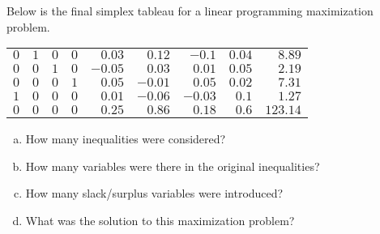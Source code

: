 \documentclass[11pt,letterpaper]{article}
\begin{document}
\newpage



 Below is the final simplex tableau for a linear programming maximization problem. \par
	\begin{table}[H]
	\centering
	\begin{tabular}{rrrrrrrrr}
	$0$ & $1$ & $0$ & $0$ & $0.03$ & $0.12$ & $-0.1$ & $0.04$ & $8.89$ \\
	$0$ & $0$ & $1$ & $0$ & $-0.05$ & $0.03$ & $0.01$ & $0.05$ & $2.19$ \\
	$0$ & $0$ & $0$ & $1$ & $0.05$ & $-0.01$ & $0.05$ & $0.02$ & $7.31$ \\
	$1$ & $0$ & $0$ & $0$ & $0.01$ & $-0.06$ & $-0.03$ & $0.1$ & $1.27$ \\
	$0$ & $0$ & $0$ & $0$ & $0.25$ & $0.86$ & $0.18$ & $0.6$ & $123.14$
	\end{tabular}
	\end{table}

\begin{enumerate}[(a)]
\item How many inequalities were considered?
\item How many variables were there in the original inequalities?
\item How many slack/surplus variables were introduced?
\item What was the solution to this maximization problem?
\end{enumerate} \pspace
\end{document}
